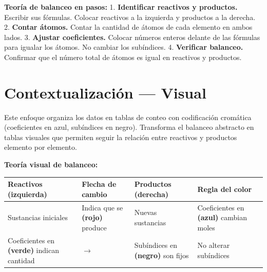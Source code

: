 \documentclass[
  spanish,
  letterpaper,
  12pt,
  oneside,
  open=any]{scrbook}
\newcounter{none} %
\newcommand{\setcolorsection}[2]{%
  \definecolor{currentsectionbg}{HTML}{#1}%
  \definecolor{currentsectionborder}{HTML}{#2}%
}
\begin{document}
\textbf{Teoría de balanceo en pasos:} 1. \textbf{Identificar reactivos y
productos.} Escribir sus fórmulas. Colocar reactivos a la izquierda y
productos a la derecha. 2. \textbf{Contar átomos.} Contar la cantidad de
átomos de cada elemento en ambos lados. 3. \textbf{Ajustar
coeficientes.} Colocar números enteros delante de las fórmulas para
igualar los átomos. No cambiar los subíndices. 4. \textbf{Verificar
balanceo.} Confirmar que el número total de átomos es igual en reactivos
y productos.

\setcolorsection{d6c7e7}{c0b0d8}

\section{Contextualización ---
Visual}\label{contextualizaciuxf3n-visual}

Este enfoque organiza los datos en tablas de conteo con codificación
cromática (coeficientes en azul, subíndices en negro). Transforma el
balanceo abstracto en tablas visuales que permiten seguir la relación
entre reactivos y productos elemento por elemento.

\textbf{Teoría visual de balanceo:}

{\def\LTcaptype{none} %
\begin{longtable}[]{@{}
  >{\raggedright\arraybackslash}p{}
  >{\raggedright\arraybackslash}p{}
  >{\raggedright\arraybackslash}p{}
  >{\raggedright\arraybackslash}p{}@{}}
\toprule\noalign{}
\begin{minipage}[b]{\linewidth}\raggedright
Reactivos (izquierda)
\end{minipage} & \begin{minipage}[b]{\linewidth}\raggedright
Flecha de cambio
\end{minipage} & \begin{minipage}[b]{\linewidth}\raggedright
Productos (derecha)
\end{minipage} & \begin{minipage}[b]{\linewidth}\raggedright
Regla del color
\end{minipage} \\
\midrule\noalign{}
\endhead
\bottomrule\noalign{}
\endlastfoot
Sustancias iniciales & Indica que se \textbf{(rojo)} produce & Nuevas
sustancias & Coeficientes en \textbf{(azul)} cambian moles \\
Coeficientes en \textbf{(verde)} indican cantidad & \(\rightarrow\) &
Subíndices en \textbf{(negro)} son fijos & No alterar subíndices \\
\end{longtable}
}
\end{document}
